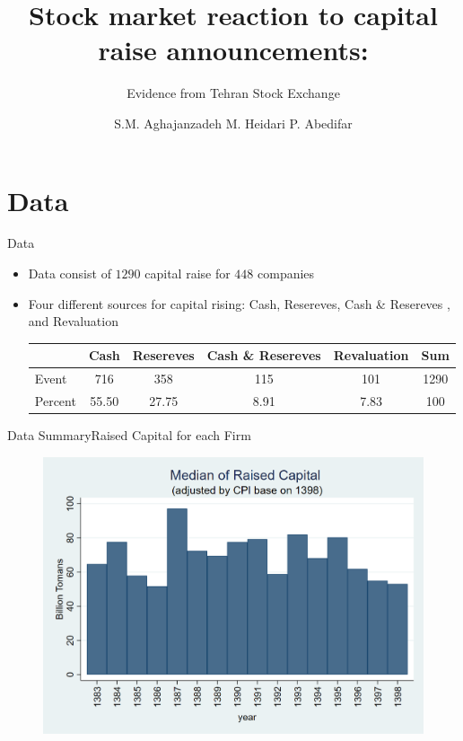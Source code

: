 \documentclass{beamer}
\title[Capital Raise]{Stock market reaction to capital raise announcements:}
\subtitle{Evidence from Tehran Stock Exchange}
\author[Aghajanzadeh, Heidari \&Abedifar]{S.M. Aghajanzadeh \qquad M. Heidari \qquad P. Abedifar }
\institute[]{Tehran Institute for Advanced Studies }
\begin{document}
	
	{\maketitle}
	
	\section{Data}
	\begin{frame}{Data}
		\begin{itemize}
			\item Data consist of $1290$ capital raise for $448$ companies 
			
			\item Four different sources for capital rising: Cash, Resereves, Cash \& Resereves , and Revaluation \\
			
			\begin{table}[htbp]
				\centering
				\label{t1}
				\resizebox{0.7\textwidth}{!}
				{
					\begin{tabular}{lccccc}
						\hline
						\hline
						& \multicolumn{1}{l}{Cash} & \multicolumn{1}{c}{Resereves} & \multicolumn{1}{c}{Cash \& Resereves} & \multicolumn{1}{c}{Revaluation} &  \multicolumn{1}{c}{Sum} \\
						\hline
						Event & 716   & 358   & 115   & 101   & 1290 \\
						Percent & 55.50 & 27.75 & 8.91  & 7.83  & 100 \\
						\hline\hline
					\end{tabular}
				}
				\label{tab:addlabel}
				
			\end{table}%
			
			
		\end{itemize}
		
	\end{frame}
	
	
	
	
	
	
	\begin{frame}{Data Summary}{Raised Capital for each Firm}
		\begin{figure}
			\centering
			\includegraphics[width=0.7\linewidth]{Output/MedianCapRaiseAdjusted.png}
			\label{fig:mediancapraise}
		\end{figure}
	\end{frame}
	
\end{document}

